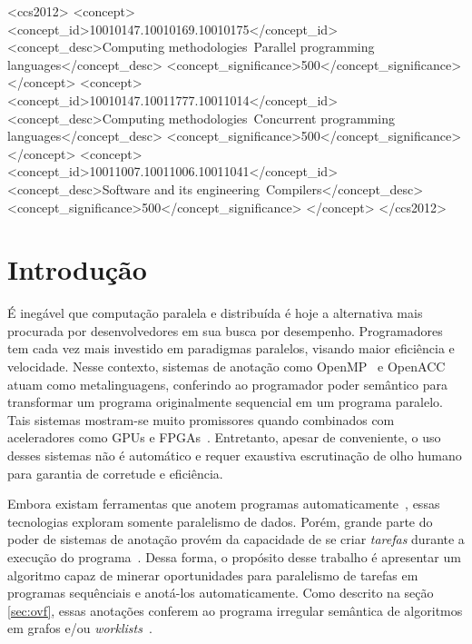 \documentclass[sigplan,10pt,review]{acmart}
\begin{document}
 \begin{CCSXML}
<ccs2012>
<concept>
<concept_id>10010147.10010169.10010175</concept_id>
<concept_desc>Computing methodologies~Parallel programming languages</concept_desc>
<concept_significance>500</concept_significance>
</concept>
<concept>
<concept_id>10010147.10011777.10011014</concept_id>
<concept_desc>Computing methodologies~Concurrent programming languages</concept_desc>
<concept_significance>500</concept_significance>
</concept>
<concept>
<concept_id>10011007.10011006.10011041</concept_id>
<concept_desc>Software and its engineering~Compilers</concept_desc>
<concept_significance>500</concept_significance>
</concept>
</ccs2012>
\end{CCSXML}



\maketitle

\section{Introdu\c{c}\~{a}o}
\label{sec:intro}

É inegável que computação paralela e distribuída é hoje a alternativa mais procurada por 
desenvolvedores em sua busca por desempenho. Programadores tem cada vez mais investido
em paradigmas paralelos, visando maior eficiência e velocidade. Nesse contexto, sistemas de
anotação como OpenMP~\cite{JaegerCP15} e
OpenACC~\cite{OpenACC20} atuam como metalinguagens, conferindo ao programador
poder semântico para transformar um programa originalmente sequencial
em um programa paralelo. Tais sistemas mostram-se muito promissores quando
combinados com aceleradores como GPUs e FPGAs~\cite{Mendonca17,Poesia17}.
Entretanto, apesar de conveniente, o uso desses sistemas não é automático e
requer exaustiva escrutinação de olho humano para garantia de corretude e eficiência.

Embora existam ferramentas que anotem programas automaticamente~\cite{Mendonca16,Pingali11},
essas tecnologias exploram somente paralelismo de dados.  Porém, grande
parte do poder de sistemas de anotação provém da capacidade de se criar \textit{tarefas}
durante a execução do programa~\cite{Ayguade09}. Dessa forma, o propósito desse trabalho
é apresentar um algoritmo capaz de minerar oportunidades para paralelismo de tarefas
em programas sequênciais e anotá-los automaticamente. Como descrito na seção \ref{sec:ovf},
essas anotações conferem ao programa irregular semântica de algoritmos em grafos e/ou \textit{worklists}~\cite{Pingali11}.
\end{document}
